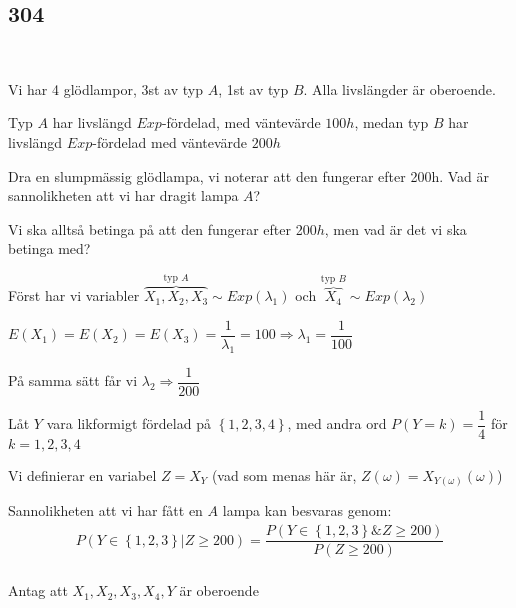 \subsection{304}\hfill\\\par
\noindent Vi har 4 glödlampor, 3st av typ $A$, 1st av typ $B$. Alla livslängder är oberoende.\par
\noindent Typ $A$ har livslängd $Exp$-fördelad, med väntevärde $100h$, medan typ $B$ har livslängd $Exp$-fördelad med väntevärde $200h$\par
\noindent Dra en slumpmässig glödlampa, vi noterar att den fungerar efter 200h. Vad är sannolikheten att vi har dragit lampa $A$?
\par\bigskip
\noindent Vi ska alltså betinga på att den fungerar efter 200$h$, men vad är det vi ska betinga med?
\par\bigskip
\noindent Först har vi variabler $\overbrace{X_1,X_2,X_3}^{\text{typ $A$}}\sim Exp(\lambda_1)$ och $\overbrace{X_4}^{\text{typ $B$}}\sim Exp(\lambda_2)$\par
\noindent $E(X_1) = E(X_2)=E(X_3) = \dfrac{1}{\lambda_1} = 100\Rightarrow \lambda_1 = \dfrac{1}{100}$\par
\noindent På samma sätt får vi $\lambda_2 \Rightarrow \dfrac{1}{200}$\par
\noindent Låt $Y$ vara likformigt fördelad på $\left\{1,2,3,4\right\}$, med andra ord $P(Y=k) =\dfrac{1}{4}$ för $k=1,2,3,4$\par
\noindent Vi definierar en variabel $Z = X_Y$ (vad som menas här är, $Z(\omega) = X_{Y(\omega)}(\omega)$)\par
\noindent Sannolikheten att vi har fått en $A$ lampa kan besvaras genom:
\begin{equation*}
  \begin{gathered}
    P(Y\in\left\{1,2,3\right\}|Z\geq200) = \dfrac{P(Y\in\left\{1,2,3\right\}\& Z\geq200)}{P(Z\geq200)}\\
  \end{gathered}
\end{equation*}\par
\noindent Antag att $X_1,X_2,X_3,X_4,Y$ är oberoende
